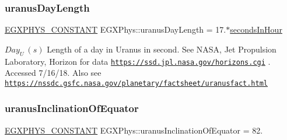 \subsubsection{\texorpdfstring{uranus\+Day\+Length}{uranusDayLength}}
{\footnotesize\ttfamily \mbox{\hyperlink{group___e_g_x_phys-_constants-_macros_ga76980d288494ce1714c9ac68a95ba702}{E\+G\+X\+P\+H\+Y\+S\+\_\+\+C\+O\+N\+S\+T\+A\+NT}} E\+G\+X\+Phys\+::uranus\+Day\+Length = 17.$\ast$\mbox{\hyperlink{namespace_e_g_x_phys_a7c3165cd93e36f1fb8e9fef80f117bef}{seconds\+In\+Hour}}}

$ Day_{U} \ (s)$ Length of a day in Uranus in second. See N\+A\+SA, Jet Propulsion Laboratory, Horizon for data \href{https://ssd.jpl.nasa.gov/horizons.cgi}{\tt https\+://ssd.\+jpl.\+nasa.\+gov/horizons.\+cgi} . Accessed 7/16/18. Also see \href{https://nssdc.gsfc.nasa.gov/planetary/factsheet/uranusfact.html}{\tt https\+://nssdc.\+gsfc.\+nasa.\+gov/planetary/factsheet/uranusfact.\+html} \mbox{\label{group___e_g_x_phys-_constants-_astrophysics-_solar_system-_uranus-_orbit_gaf67afd76c304a2c07c4f9aafc26ace8b}} 
\subsubsection{\texorpdfstring{uranus\+Inclination\+Of\+Equator}{uranusInclinationOfEquator}}
{\footnotesize\ttfamily \mbox{\hyperlink{group___e_g_x_phys-_constants-_macros_ga76980d288494ce1714c9ac68a95ba702}{E\+G\+X\+P\+H\+Y\+S\+\_\+\+C\+O\+N\+S\+T\+A\+NT}} E\+G\+X\+Phys\+::uranus\+Inclination\+Of\+Equator = 82.}

